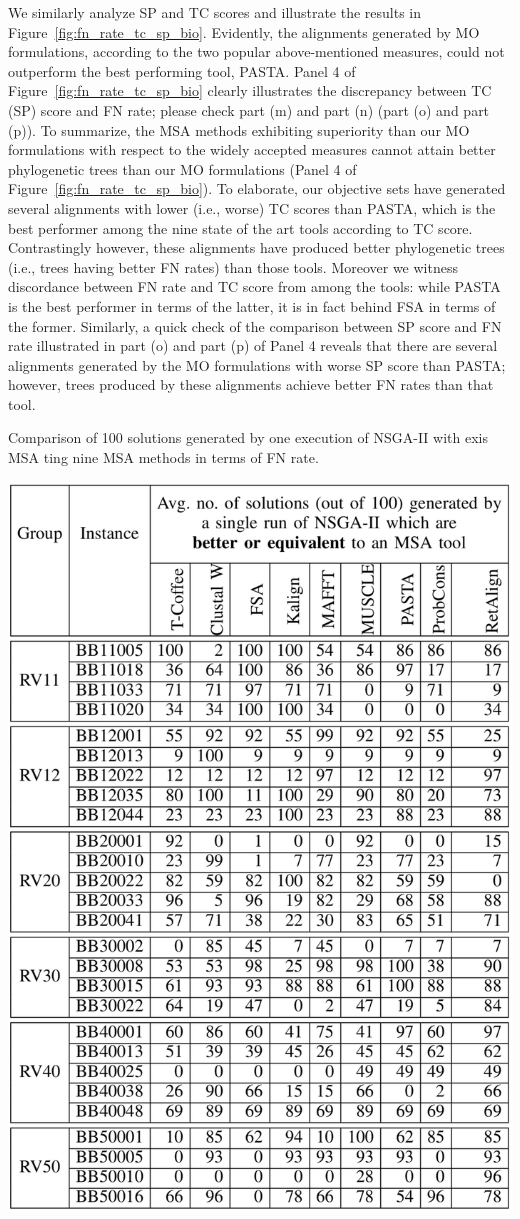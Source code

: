 We similarly analyze SP and TC scores and illustrate the results in Figure~\ref{fig:fn_rate_tc_sp_bio}. Evidently, the alignments generated by MO formulations, according to the two popular above-mentioned measures, could not outperform the best performing tool, PASTA.
Panel 4 of Figure~\ref{fig:fn_rate_tc_sp_bio} clearly illustrates the discrepancy between TC (SP) score and FN rate; please check part (m) and part (n) (part (o) and part (p)).
To summarize, the MSA methods exhibiting superiority than our MO formulations with respect to the widely accepted measures cannot attain better phylogenetic trees than our MO formulations (Panel 4 of Figure~\ref{fig:fn_rate_tc_sp_bio}). To elaborate, our objective sets have generated several alignments with lower (i.e., worse) TC scores than PASTA, which is the best performer among the nine state of the art tools according to TC score.  
Contrastingly however, these alignments have produced better phylogenetic trees (i.e., trees having better FN rates) than those tools. Moreover we witness discordance between FN rate and TC score from among the tools: while PASTA is the best performer in terms of the latter, it is in fact behind FSA in terms of the former. Similarly, a quick check of the comparison between SP score and FN rate illustrated in part (o) and part (p) of Panel 4 reveals that there are several alignments generated by the MO formulations with worse SP score than PASTA; however, trees produced by these alignments achieve better FN rates than that tool.   

\begin{table}[!h]
\centering
	\caption{Comparison of 100 solutions generated by one execution of NSGA-II with exis MSA ting nine MSA methods in terms of FN rate.} \includegraphics[width=0.5\columnwidth]{Figure/comparison_gap_sop}
	\label{tab:balibase_good_solutions}\end{table}





